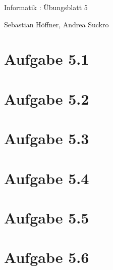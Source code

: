 \documentclass{article}
\begin{document}
\begin{center}
  \Large{Informatik \revD: Übungsblatt 5}

  \large{Sebastian Höffner, Andrea Suckro}
\end{center}



\section*{Aufgabe 5.1}



\section*{Aufgabe 5.2}



\section*{Aufgabe 5.3}



\section*{Aufgabe 5.4}



\section*{Aufgabe 5.5}



\section*{Aufgabe 5.6}
\end{document}
